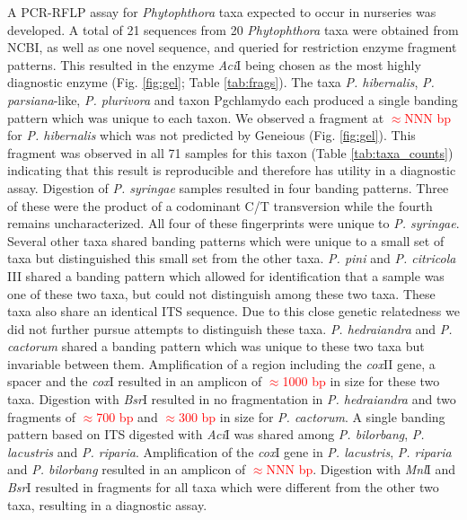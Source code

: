 \documentclass[12pt]{article}
\begin{document}
A PCR-RFLP assay for \emph{Phytophthora} taxa expected to occur in nurseries was developed.  A total of 21 sequences from 20 \emph{Phytophthora} taxa were obtained from NCBI, as well as one novel sequence, and queried for restriction enzyme fragment patterns.  This resulted in the enzyme \emph{Aci}I being chosen as the most highly diagnostic enzyme (Fig. \ref{fig:gel}; Table \ref{tab:frags}).  The taxa \emph{P. hibernalis}, \emph{P. parsiana}-like, \emph{P. plurivora} and taxon Pgchlamydo each produced a single banding pattern which was unique to each taxon.  
We observed a fragment at \textcolor{red}{$\approx$NNN bp} for \emph{P. hibernalis} which was not predicted by Geneious (Fig. \ref{fig:gel}).  This fragment was observed in all 71 samples for this taxon (Table \ref{tab:taxa_counts}) indicating that this result is reproducible and therefore has utility in a diagnostic assay.  Digestion of \emph{P. syringae} samples resulted in four banding patterns.  Three of these were the product of a codominant C/T transversion while the fourth remains uncharacterized.  All four of these fingerprints were unique to \emph{P. syringae}.  Several other taxa shared banding patterns which were unique to a small set of taxa but distinguished this small set from the other taxa.  \emph{P. pini} and \emph{P. citricola} III shared a banding pattern which allowed for identification that a sample was one of these two taxa, but could not distinguish among these two taxa.  These taxa also share an identical ITS sequence.  Due to this close genetic relatedness we did not further pursue attempts to distinguish these taxa.  \emph{P. hedraiandra} and \emph{P. cactorum} shared a banding pattern which was unique to these two taxa but invariable between them.  Amplification of a region including the \emph{cox}II gene, a spacer and the \emph{cox}I resulted in an amplicon of \textcolor{red}{$\approx$1000 bp} in size for these two taxa.  Digestion with \emph{Bsr}I resulted in no fragmentation in \emph{P. hedraiandra} and two fragments of \textcolor{red}{$\approx$700 bp} and \textcolor{red}{$\approx$300 bp} in size for \emph{P. cactorum}.  A single banding pattern based on ITS digested with \emph{Aci}I was shared among \emph{P. bilorbang}, \emph{P. lacustris} and \emph{P. riparia}.  Amplification of the \emph{cox}I gene in \emph{P. lacustris}, \emph{P. riparia} and \emph{P. bilorbang} resulted in an amplicon of \textcolor{red}{$\approx$NNN bp}.  Digestion with \emph{Mnl}I and \emph{Bsr}I resulted in fragments for all taxa which were different from the other two taxa, resulting in a diagnostic assay.
\end{document}
